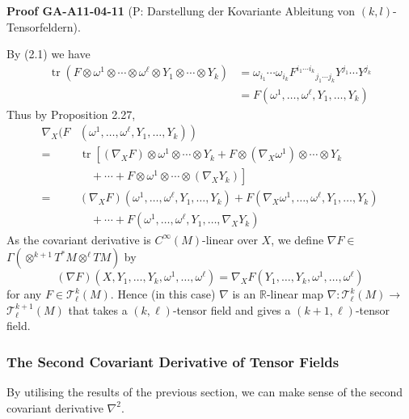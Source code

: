 \documentclass[10pt, letterpaper]{article}
\newcommand{\CustomHeading}[3]{%
  \par\medskip\noindent%
  \textbf{#1 #2} \textnormal{(#3)}.\enskip%
}
\newenvironment{PROOF}[2]{\begin{unitbox}\CustomHeading{Proof}{#1}{#2}}{\end{unitbox}}
\begin{document}
\begin{PROOF}{GA-A11-04-11}{P: Darstellung der Kovariante Ableitung von $(k,l)$-Tensorfeldern}
By (2.1) we have
$$
\begin{aligned}
\operatorname{tr}\left(F \otimes \omega^{1} \otimes \cdots \otimes \omega^{\ell} \otimes Y_{1} \otimes \cdots \otimes Y_{k}\right) & =\omega_{i_{1}} \cdots \omega_{i_{k}} F^{i_{1} \cdots i_{k}}{ }_{j_{1} \cdots j_{k}} Y^{j_{1}} \cdots Y^{j_{k}} \\
& =F\left(\omega^{1}, \ldots, \omega^{\ell}, Y_{1}, \ldots, Y_{k}\right)
\end{aligned}
$$
Thus by Proposition 2.27,
$$
\begin{aligned}
\nabla_{X}(F & \left.\left(\omega^{1}, \ldots, \omega^{\ell}, Y_{1}, \ldots, Y_{k}\right)\right) \\
= & \operatorname{tr}\left[\left(\nabla_{X} F\right) \otimes \omega^{1} \otimes \cdots \otimes Y_{k}+F \otimes\left(\nabla_{X} \omega^{1}\right) \otimes \cdots \otimes Y_{k}\right. \\
& \left.\quad+\cdots+F \otimes \omega^{1} \otimes \cdots \otimes\left(\nabla_{X} Y_{k}\right)\right] \\
= & \left(\nabla_{X} F\right)\left(\omega^{1}, \ldots, \omega^{\ell}, Y_{1}, \ldots, Y_{k}\right)+F\left(\nabla_{X} \omega^{1}, \ldots, \omega^{\ell}, Y_{1}, \ldots, Y_{k}\right) \\
& \quad+\cdots+F\left(\omega^{1}, \ldots, \omega^{\ell}, Y_{1}, \ldots, \nabla_{X} Y_{k}\right)
\end{aligned}
$$
As the covariant derivative is $C^{\infty}(M)$-linear over $X$, we define $\nabla F \in$ $\Gamma\left(\otimes^{k+1} T^{*} M \otimes^{\ell} T M\right)$ by
$$
(\nabla F)\left(X, Y_{1}, \ldots, Y_{k}, \omega^{1}, \ldots, \omega^{\ell}\right)=\nabla_{X} F\left(Y_{1}, \ldots, Y_{k}, \omega^{1}, \ldots, \omega^{\ell}\right)
$$
for any $F \in \mathscr{T}_{\ell}^{k}(M)$. Hence (in this case) $\nabla$ is an $\mathbb{R}$-linear map $\nabla: \mathscr{T}_{\ell}^{k}(M) \rightarrow$ $\mathscr{T}_{\ell}^{k+1}(M)$ that takes a $(k, \ell)$-tensor field and gives a $(k+1, \ell)$-tensor field.
\end{PROOF}



\subsubsection*{The Second Covariant Derivative of Tensor Fields}


By utilising the results of the previous section, we can make sense of the second covariant derivative $\nabla^{2}$.
\end{document}
